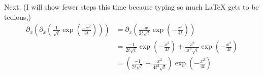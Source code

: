 \documentclass[letterpaper,11pt]{article}
\newcommand{\parens}[1]{\left(#1\right)}
\begin{document}
\begin{enumerate}
\begin{enumerate}
                Next, (I will show fewer steps this time because typing so much
                \LaTeX{} gets to be tedious,)
                \begin{align*}
                    \partial_x \parens{
                        \partial_x \parens{
                            \frac{
                                1
                            }{
                                \sqrt{t}
                            }
                            \exp\parens{
                                \frac{
                                    - x^2
                                }{
                                    4 t
                                }
                            }
                        }
                    }
                    &=
                    \partial_x \parens{
                        \frac{
                            -x
                        }{
                            2 t \sqrt{t}
                        }
                        \exp\parens{
                            - \frac{
                                x^2
                            }{
                                4 t
                            }
                        }
                    } \\
                    &=
                    \frac{
                        -1
                    }{
                        2 t \sqrt{t}
                    }
                    \exp\parens{
                        - \frac{
                            x^2
                        }{
                            4 t
                        }
                    }
                    +
                    \frac{
                        x^2
                    }{
                        4 t^2 \sqrt{t}
                    }
                    \exp\parens{
                        - \frac{
                            x^2
                        }{
                            4 t
                        }
                    } \\
                    &=
                    \parens{
                        \frac{
                            -1
                        }{
                            2 t \sqrt{t}
                        }
                        +
                        \frac{
                            x^2
                        }{
                            4 t^2 \sqrt{t}
                        }
                    }
                    \exp\parens{
                        - \frac{
                            x^2
                        }{
                            4 t
}}
\end{align*}
\end{enumerate}
\end{enumerate}
\end{document}
